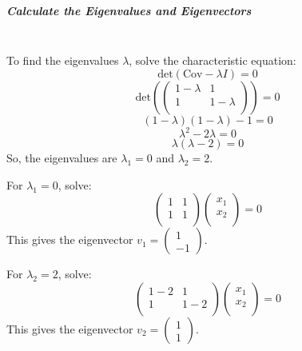 \documentclass[]{article}
\begin{document}
	\subparagraph{Calculate the Eigenvalues and Eigenvectors}
	\noindent\\
	To find the eigenvalues \( \lambda \), solve the characteristic equation:
	$$
	\text{det}(\text{Cov} - \lambda I) = 0
	$$
	$$
	\text{det}\left(\begin{pmatrix}
		1 - \lambda & 1 \\
		1 & 1 - \lambda \\
	\end{pmatrix}\right) = 0
	$$
	$$
	(1 - \lambda)(1 - \lambda) - 1 = 0
	$$
	$$
	\lambda^2 - 2\lambda = 0
	$$
	$$
	\lambda(\lambda - 2) = 0
	$$
	So, the eigenvalues are $\lambda_1 = 0$ and $\lambda_2 = 2$.
	
	For \( \lambda_1 = 0 \), solve:
	$$
	\begin{pmatrix}
		1 & 1 \\
		1 & 1 \\
	\end{pmatrix}
	\begin{pmatrix}
		x_1 \\
		x_2 \\
	\end{pmatrix}
	= 0
	$$
	This gives the eigenvector \( v_1 = \begin{pmatrix} 1 \\ -1 \end{pmatrix} \).
	
	For \( \lambda_2 = 2 \), solve:
	$$
	\begin{pmatrix}
		1 - 2 & 1 \\
		1 & 1 - 2 \\
	\end{pmatrix}
	\begin{pmatrix}
		x_1 \\
		x_2 \\
	\end{pmatrix}
	= 0
	$$
	This gives the eigenvector \( v_2 = \begin{pmatrix} 1 \\ 1 \end{pmatrix} \).
	
\end{document}
